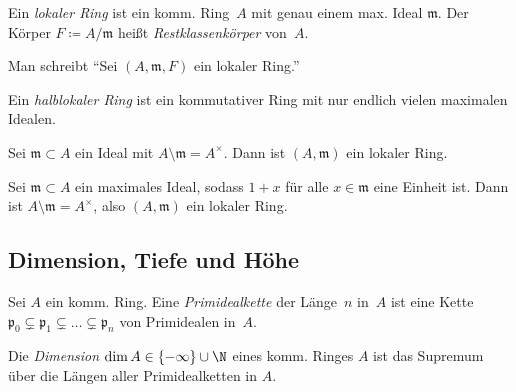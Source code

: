 \documentclass{cheat-sheet}
\newcommand{\ppp}{\mathfrak{p}}
\newcommand{\mmm}{\mathfrak{m}}
\begin{document}

\begin{defn}
  Ein \emph{lokaler Ring} ist ein komm. Ring~$A$ mit genau einem max. Ideal $\mmm$.
  Der Körper $F \coloneqq A/\mmm$ heißt \emph{Restklassenkörper} von~$A$.
\end{defn}

\begin{nota}
  Man schreibt "`Sei $(A, \mmm, F)$ ein lokaler Ring."'
\end{nota}

\begin{defn}
  Ein \emph{halblokaler Ring} ist ein kommutativer Ring mit nur endlich vielen maximalen Idealen.
\end{defn}

\begin{lem}
  Sei $\mmm \subset A$ ein Ideal mit $A \setminus \mmm = A^\times$.
  Dann ist $(A, \mmm)$ ein lokaler Ring.
\end{lem}

\begin{prop}
  Sei $\mmm \subset A$ ein maximales Ideal, sodass $1 + x$ für alle $x \in \mmm$ eine Einheit ist.
  Dann ist $A \setminus \mmm = A^\times$, also $(A, \mmm)$ ein lokaler Ring.
\end{prop}

\subsection{Dimension, Tiefe und Höhe}

\begin{defn}
  Sei $A$ ein komm. Ring.
  Eine \emph{Primidealkette} der Länge~$n$ in~$A$ ist eine Kette $\ppp_0 \subsetneq \ppp_1 \subsetneq \ldots \subsetneq \ppp_n$ von Primidealen in~$A$.
\end{defn}

\begin{defn}
  Die \emph{Dimension} $\dim A \in \{ - \infty \} \cup \N$ eines komm. Ringes $A$ ist das Supremum über die Längen aller Primidealketten in $A$.
\end{defn}

\begin{bspe}
   \quad
   \quad
\end{bspe}
\end{document}
